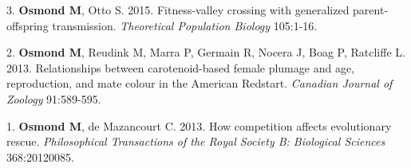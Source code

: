 \documentclass[12pt]{article}
\begin{document}
\noindent\hspace{.1cm}3. \textbf{Osmond M}, Otto S. 2015. Fitness-valley crossing with generalized parent-offspring transmission. \textit{Theoretical Population Biology} 105:1-16. %

\noindent\hspace{.1cm}2. \textbf{Osmond M}, Reudink M, Marra P, Germain R, Nocera J,  Boag P, Ratcliffe L.  2013. Relationships between carotenoid-based female plumage and age, reproduction, and mate colour in the American Redstart. \textit{Canadian Journal of Zoology} 91:589-595. %

\noindent\hspace{.1cm}1. \textbf{Osmond M}, de Mazancourt C. 2013. How competition affects evolutionary rescue. \textit{Philosophical Transactions of the Royal Society B: Biological Sciences} 368:20120085. %

%

\end{document}
